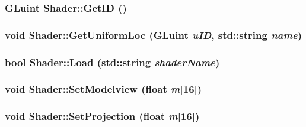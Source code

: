 \hypertarget{class_shader_c77c9f2dc144eeb40c6c07182d69c308}{
\subsubsection[{GetID}]{\setlength{\rightskip}{0pt plus 5cm}GLuint Shader::GetID ()}}
\label{class_shader_c77c9f2dc144eeb40c6c07182d69c308}


\hypertarget{class_shader_145c8bf4d63ca088c78607b692b5d318}{
\subsubsection[{GetUniformLoc}]{\setlength{\rightskip}{0pt plus 5cm}void Shader::GetUniformLoc (GLuint {\em uID}, \/  std::string {\em name})}}
\label{class_shader_145c8bf4d63ca088c78607b692b5d318}


\hypertarget{class_shader_4a6a8eb7a7ed9dedc46c2abbafb25785}{
\subsubsection[{Load}]{\setlength{\rightskip}{0pt plus 5cm}bool Shader::Load (std::string {\em shaderName})}}
\label{class_shader_4a6a8eb7a7ed9dedc46c2abbafb25785}


\hypertarget{class_shader_f49e77ad3653d4787ef754e3e495c41b}{
\subsubsection[{SetModelview}]{\setlength{\rightskip}{0pt plus 5cm}void Shader::SetModelview (float {\em m}\mbox{[}16\mbox{]})}}
\label{class_shader_f49e77ad3653d4787ef754e3e495c41b}


\hypertarget{class_shader_212a29a2b803b55a80faf0d55352ba2c}{
\subsubsection[{SetProjection}]{\setlength{\rightskip}{0pt plus 5cm}void Shader::SetProjection (float {\em m}\mbox{[}16\mbox{]})}}
\label{class_shader_212a29a2b803b55a80faf0d55352ba2c}


